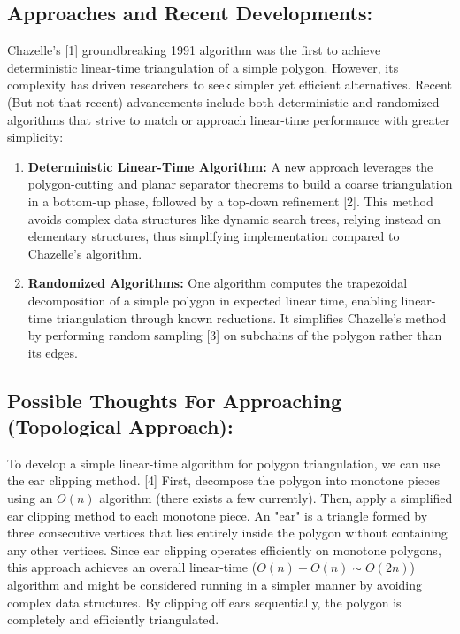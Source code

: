 \documentclass{article}
\begin{document}
\subsection*{Approaches and Recent Developments:}
Chazelle's [1] groundbreaking 1991 algorithm was the first to achieve deterministic linear-time triangulation of a simple polygon. However, its complexity has driven researchers to seek simpler yet efficient alternatives. Recent (But not that recent) advancements include both deterministic and randomized algorithms that strive to match or approach linear-time performance with greater simplicity:
\begin{enumerate}
    \item \textbf{Deterministic Linear-Time Algorithm: }
    A new approach leverages the polygon-cutting and planar separator theorems to build a coarse triangulation in a bottom-up phase, followed by a top-down refinement [2]. This method avoids complex data structures like dynamic search trees, relying instead on elementary structures, thus simplifying implementation compared to Chazelle's algorithm.
    \item \textbf{Randomized Algorithms: }
    One algorithm computes the trapezoidal decomposition of a simple polygon in expected linear time, enabling linear-time triangulation through known reductions. It simplifies Chazelle's method by performing random sampling  [3] on subchains of the polygon rather than its edges.
\end{enumerate}

\subsection*{Possible Thoughts For Approaching (Topological Approach):}
To develop a simple linear-time algorithm for polygon triangulation, we can use the ear clipping method. [4]
First, decompose the polygon into monotone pieces using an \( O(n) \) algorithm (there exists a few currently).
Then, apply a simplified ear clipping method to each monotone piece.
An "ear" is a triangle formed by three consecutive vertices that lies entirely inside the polygon without containing any other vertices. 
Since ear clipping operates efficiently on monotone polygons, this approach achieves an overall linear-time (\( O(n) + O(n) \sim O(2n) \)) algorithm and might be considered running in a simpler manner by avoiding complex data structures. 
By clipping off ears sequentially, the polygon is completely and efficiently triangulated.
\end{document}
